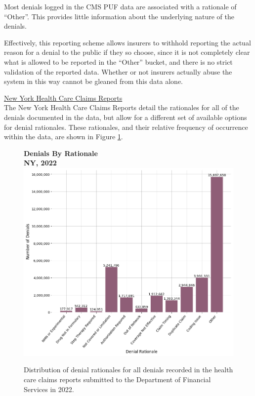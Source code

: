 \documentclass[12pt, a4paper,twoside,parskip=full]{report}
\theoremstyle{plain} %
\theoremstyle{definition} %
\theoremstyle{remark} %
\numberwithin{equation}{chapter}
\begin{document}
		\clearpage

		Most denials logged in the CMS PUF data are associated with a rationale of ``Other''. This provides little information about the underlying nature of the denials.
		
		Effectively, this reporting scheme allows insurers to withhold reporting the actual reason for a denial to the public if they so choose, since it is not completely clear what is allowed to be reported in the ``Other'' bucket, and there is no strict validation of the reported data. Whether or not insurers actually abuse the system in this way cannot be gleaned from this data alone.
		
		\underline{New York Health Care Claims Reports}\\
		
		The New York Health Care Claims Reports detail the rationales for all of the denials documented in the data, but allow for a different set of available options for denial rationales. These rationales, and their relative frequency of occurrence within the data, are shown in Figure \ref{nyrationaledist}.
		
		\begin{figure}[h!]
			\centering
			\textbf{Denials By Rationale}\\
			\textbf{NY, 2022}\\
			\includegraphics[width=\columnwidth]{images/ny_claim_reports/denial_rationale_dist.png}
			\caption{Distribution of denial rationales for all denials recorded in the health care claims reports submitted to the Department of Financial Services in 2022.}
			\label{nyrationaledist}
		\end{figure}
	
\end{document}
